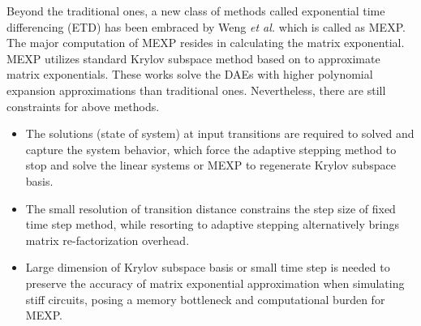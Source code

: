 Beyond the traditional ones, 
a new class of methods called exponential
time differencing (ETD) has been embraced by 
Weng \emph{et al.} \cite{Weng12_TCAD} 
which is called as MEXP.
The major computation of MEXP resides in calculating the matrix exponential. 
MEXP utilizes standard Krylov subspace method based on \cite{Moler03} to approximate matrix exponentials.  
These works solve the DAEs with higher 
polynomial expansion approximations \cite{Saad92} than traditional ones.
Nevertheless, there are still constraints for above methods. 
\begin{itemize}
\item
The solutions (state of system) at input transitions are required to solved and capture the 
system behavior, which force the adaptive stepping method to stop
and solve the linear systems or MEXP to regenerate Krylov subspace basis.
\item
The small resolution of transition distance constrains the step size of fixed time step method, 
while resorting to adaptive stepping alternatively brings matrix re-factorization overhead.
\item
Large dimension of Krylov subspace basis or small time step is needed to preserve the accuracy of
matrix exponential approximation when simulating stiff circuits, 
posing a memory bottleneck and computational burden for MEXP.
\end{itemize}


